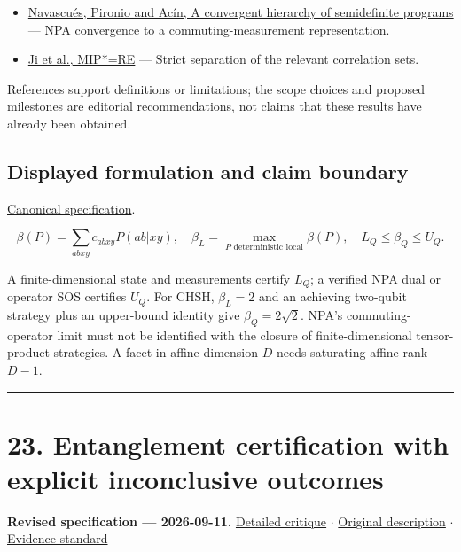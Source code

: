\documentclass[
  11pt,
]{article}
\begin{document}
\begin{itemize}
\item
  \href{https://arxiv.org/abs/0803.4290}{Navascués, Pironio and Acín, A
  convergent hierarchy of semidefinite programs} --- NPA convergence to
  a commuting-measurement representation.
\item
  \href{https://arxiv.org/abs/2001.04383}{Ji et al., MIP*=RE} --- Strict
  separation of the relevant correlation sets.
\end{itemize}

References support definitions or limitations; the scope choices and
proposed milestones are editorial recommendations, not claims that these
results have already been obtained.

\subsection{Displayed formulation and claim boundary}

\href{https://github.com/rick-stevens-ai/Pure-Thought/blob/main/PRDs/22-Bell-Inequalities-Nonlocality.md}{Canonical
specification}.

\[\beta(P)=\sum_{abxy}c_{abxy}P(ab|xy),\quad
\beta_L=\max_{P\text{ deterministic local}}\beta(P),\quad
L_Q\le\beta_Q\le U_Q.\]

A finite-dimensional state and measurements certify \(L_Q\); a verified
NPA dual or operator SOS certifies \(U_Q\). For CHSH, \(\beta_L=2\) and
an achieving two-qubit strategy plus an upper-bound identity give
\(\beta_Q=2\sqrt2\). NPA's commuting-operator limit must not be
identified with the closure of finite-dimensional tensor-product
strategies. A facet in affine dimension \(D\) needs saturating affine
rank \(D-1\).

\begin{center}\rule{0.5\linewidth}{0.5pt}\end{center}

\section{23. Entanglement certification with explicit inconclusive
outcomes}

\textbf{Revised specification --- 2026-09-11.}
\href{https://github.com/rick-stevens-ai/Pure-Thought/blob/main/reviews/23-Entanglement-Measures-Witnesses.md}{Detailed
critique} \ensuremath{\cdot}
\href{https://github.com/rick-stevens-ai/Pure-Thought/blob/main/archive/original-PRDs/23-Entanglement-Measures-Witnesses.md}{Original
description} \ensuremath{\cdot}
\href{https://github.com/rick-stevens-ai/Pure-Thought/blob/main/reviews/EVIDENCE-STANDARD.md}{Evidence
standard}
\end{document}
